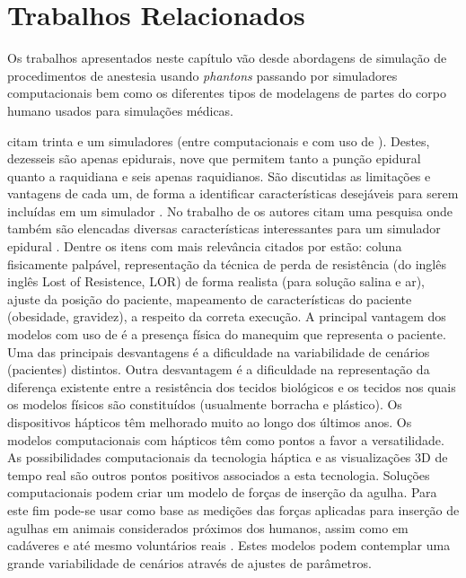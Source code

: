 \chapter{Trabalhos Relacionados} \label{cap:cap3}


Os trabalhos apresentados neste capítulo vão desde abordagens de simulação de procedimentos de anestesia usando \textit{phantons} passando por simuladores computacionais bem como os diferentes tipos de modelagens de partes do corpo humano usados para simulações médicas.  

\textcite{Vaughan2013} citam trinta e um simuladores (entre computacionais e com uso de ). Destes, dezesseis são apenas epidurais, nove que permitem tanto a punção epidural quanto a raquidiana e seis apenas raquidianos. São discutidas as limitações e vantagens de cada um, de forma a identificar características desejáveis para serem incluídas em um simulador \cite{Vaughan2013}. No trabalho de \textcite{Isaacs2015} os autores citam uma pesquisa onde também são elencadas diversas características interessantes para um simulador epidural \cite{Isaacs2015}. Dentre os itens com mais relevância citados por \textcite{Isaacs2015} estão: coluna fisicamente palpável, representação da técnica de perda de resistência (do inglês inglês Lost of Resistence, \acrshort{LOR}) de forma realista (para solução salina e ar), ajuste da posição do paciente, mapeamento de características do paciente (obesidade, gravidez),  a respeito da correta execução.
A principal vantagem dos modelos com uso de  é a presença física do manequim que representa o paciente. Uma das principais desvantagens é a dificuldade na variabilidade de cenários (pacientes) distintos. Outra desvantagem é a dificuldade na representação da diferença existente entre a resistência dos tecidos biológicos e os tecidos nos quais os modelos físicos são constituídos (usualmente borracha e plástico).
Os dispositivos hápticos têm melhorado muito ao longo dos últimos anos. Os modelos computacionais com hápticos têm como pontos a favor a versatilidade. As possibilidades computacionais da tecnologia háptica e as visualizações 3D de tempo real são outros pontos positivos associados a esta tecnologia. 
Soluções computacionais podem criar um modelo de forças de inserção da agulha. Para este fim pode-se usar como base as medições das forças aplicadas para inserção de agulhas em animais considerados próximos dos humanos, assim como em cadáveres e até mesmo voluntários reais \cite{Hiemenz1998, Holton2001,Langton1990,McKay2010,Naemura2009,Tran2009,Vaughan2012}. Estes modelos podem contemplar uma grande variabilidade de cenários através de ajustes de parâmetros. 

